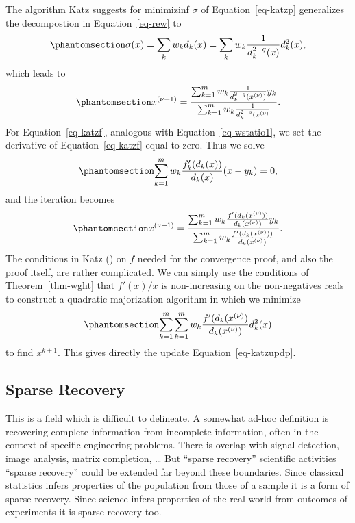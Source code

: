 \documentclass[
  12pt,
  letterpaper,
  DIV=11,
  numbers=noendperiod]{scrartcl}
\theoremstyle{plain}
\theoremstyle{plain}
\theoremstyle{plain}
\theoremstyle{definition}
\theoremstyle{definition}
\theoremstyle{remark}
\begin{document}
The algorithm Katz suggests for minimizinf \(\sigma\) of
Equation~\ref{eq-katzp} generalizes the decompostion in
Equation~\ref{eq-rew} to
\begin{equation}\phantomsection\label{eq-katzdec}{
\sigma(x)=\sum_k w_kd_k(x)=\sum_kw_k \frac{1}{d_k^{2-q}(x)}d_k^2(x),
}\end{equation} which leads to
\begin{equation}\phantomsection\label{eq-katzupdp}{
x^{(\nu+1)}=\frac{\sum_{k=1}^mw_k\frac{1}{d_k^{2-q}(x^{(\nu)})}y_k}{\sum_{k=1}^mw_k\frac{1}{d_k^{2-q}(x^{(\nu)}}}.
}\end{equation} For Equation~\ref{eq-katzf}, analogous with
Equation~\ref{eq-wstatio1}, we set the derivative of
Equation~\ref{eq-katzf} equal to zero. Thus we solve
\begin{equation}\phantomsection\label{eq-katzder}{
\sum_{k=1}^mw_k\frac{f_k'(d_k(x))}{d_k(x)}(x-y_k)=0,
}\end{equation} and the iteration becomes
\begin{equation}\phantomsection\label{eq-katzupdf}{
x^{(\nu+1)}=\frac{\sum_{k=1}^mw_k\frac{f'(d_k(x^{(\nu)}))}{d_k(x^{(\nu)})}y_k}{\sum_{k=1}^mw_k\frac{f'(d_k(x^{(\nu)}))}{d_k(x^{(\nu)})}}.
}\end{equation} The conditions in Katz () on
\(f\) needed for the convergence proof, and also the proof itself, are
rather complicated. We can simply use the conditions of
Theorem~\ref{thm-wght} that \(f'(x)/x\) is non-increasing on the
non-negatives reals to construct a quadratic majorization algorithm in
which we minimize \begin{equation}\phantomsection\label{eq-katzmajor}{
\sum_{k=1}^m\sum_{k=1}^mw_k\frac{f'(d_k(x^{(\nu)})}{d_k(x^{(\nu)})}d_k^2(x)
}\end{equation} to find \(x^{k+1}\). This gives directly the update
Equation~\ref{eq-katzupdp}.

\subsection{Sparse Recovery}\label{sparse-recovery}

This is a field which is difficult to delineate. A somewhat ad-hoc
definition is recovering complete information from incomplete
information, often in the context of specific engineering problems.
There is overlap with signal detection, image analysis, matrix
completion, \ldots{} But ``sparse recovery'' scientific activities
``sparse recovery'' could be extended far beyond these boundaries. Since
classical statistics infers properties of the population from those of a
sample it is a form of sparse recovery. Since science infers properties
of the real world from outcomes of experiments it is sparse recovery
too.
\end{document}
